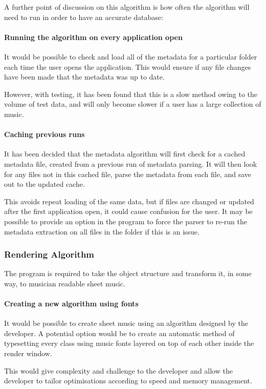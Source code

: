 A further point of discussion on this algorithm is how often the algorithm will need to run in order to have an accurate database:

\paragraph{Running the algorithm on every application open}
It would be possible to check and load all of the metadata for a particular folder each time the user opens the application. This would ensure if any file changes have been made that the metadata was up to date.

However, with testing, it has been found that this is a slow method owing to the volume of test data, and will only become slower if a user has a large collection of music. 

\paragraph{Caching previous runs}
It has been decided that the metadata algorithm will first check for a cached metadata file, created from a previous run of metadata parsing. It will then look for any files not in this cached file, parse the metadata from each file, and save out to the updated cache.

This avoids repeat loading of the same data, but if files are changed or updated after the first application open, it could cause confusion for the user. It may be possible to provide an option in the program to force the parser to re-run the metadata extraction on all files in the folder if this is an issue.

\subsubsection{Rendering Algorithm}
The program is required to take the object structure and transform it, in some way, to musician readable sheet music. 

\paragraph{Creating a new algorithm using fonts}
It would be possible to create sheet music using an algorithm designed by the developer. A potential option would be to create an automatic method of typesetting every class using music fonts layered on top of each other inside the render window.

This would give complexity and challenge to the developer and allow the developer to tailor optimisations according to speed and memory management.


